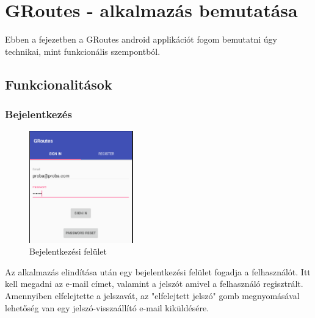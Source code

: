 \chapter{GRoutes - alkalmazás bemutatása}\label{ch:ALAP}

\begin{osszefoglal}
	Ebben a fejezetben a GRoutes android applikációt fogom bemutatni úgy technikai, mint funkcionális szempontból.
	
\end{osszefoglal}

\section{Funkcionalitások}\label{sec:ALAP:adatelem}

\subsection{Bejelentkezés}

\begin{figure}
	\centering
	\setlength{\abovecaptionskip}{0pt}
	\setlength{\belowcaptionskip}{0pt}
	\includegraphics[width=0.4\textwidth]{images/login}
	\caption{Bejelentkezési felület\label{fig:ALAP:sm2}}
\end{figure}

Az alkalmazás elindítása után egy bejelentkezési felület fogadja a felhasználót. Itt kell megadni az e-mail címet, valamint a jelszót amivel a felhasználó regisztrált. Amennyiben elfelejtette a jelszavát, az "elfelejtett jelszó" gomb megnyomásával lehetőség van egy jelszó-visszaállító e-mail kiküldésére. 



